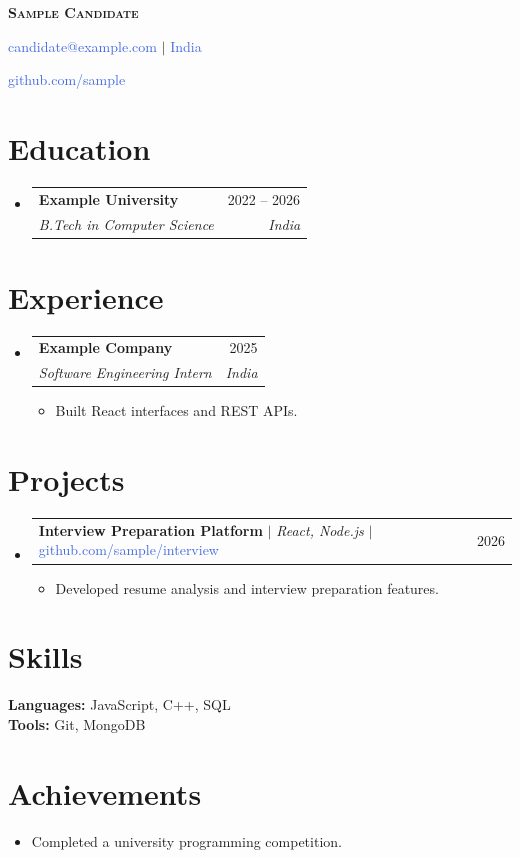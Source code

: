 \documentclass[letterpaper,10pt]{article}
\makeatletter
\newcommand{\resumeItem}[1]{
  \item\small{
    {#1}
  }
}
\newcommand{\resumeSubheading}[4]{
  \vspace{-1pt}\item
    \begin{tabular*}{0.97\textwidth}[t]{l@{\extracolsep{\fill}}r}
      \textbf{#1} & #2 \\
      \textit{\small #3} & \textit{\small #4} \\
    \end{tabular*}
    \vspace{-5pt}
}
\newcommand{\resumeProjectHeading}[2]{
    \vspace{1pt}
    \item
    \begin{tabular*}{0.97\textwidth}{l@{\extracolsep{\fill}}r}
      \small #1 & #2 \\
    \end{tabular*}
    \vspace{-5pt}
}
\newcommand{\resumeSubHeadingListStart}{
    \begin{itemize}[leftmargin=0.15in, label={}, itemsep=1pt, topsep=1pt]
}
\newcommand{\resumeSubHeadingListEnd}{
    \end{itemize}
}
\newcommand{\resumeItemListStart}{
    \begin{itemize}[leftmargin=0.18in, itemsep=0pt, topsep=0pt, parsep=0pt]
}
\newcommand{\resumeItemListEnd}{
    \end{itemize}
    \vspace{-3pt}
}
\makeatother
\begin{document}
\begin{center}
\textbf{\Huge \scshape Sample Candidate}

\vspace{3pt}
\small \textcolor{RoyalBlue}{candidate@example.com} $|$ \textcolor{RoyalBlue}{India}

\vspace{2pt}
\textcolor{RoyalBlue}{github.com/sample}
\end{center}
\vspace{-7pt}

\section{\textbf{Education}}
\resumeSubHeadingListStart
\resumeSubheading{Example University}{2022 -- 2026}{B.Tech in Computer Science}{India}

\resumeSubHeadingListEnd

\section{\textbf{Experience}}
\resumeSubHeadingListStart
\resumeSubheading{Example Company}{2025}{Software Engineering Intern}{India}
\resumeItemListStart
\resumeItem{Built React interfaces and REST APIs.}
\resumeItemListEnd
\resumeSubHeadingListEnd

\section{\textbf{Projects}}
\resumeSubHeadingListStart
\resumeProjectHeading{\textbf{Interview Preparation Platform} $|$ \emph{React, Node.js} $|$ \textcolor{RoyalBlue}{github.com/sample/interview}}{2026}
\resumeItemListStart
\resumeItem{Developed resume analysis and interview preparation features.}
\resumeItemListEnd
\resumeSubHeadingListEnd

\section{\textbf{Skills}}
\small{
\textbf{Languages:} JavaScript, C++, SQL \\
\textbf{Tools:} Git, MongoDB
}

\section{\textbf{Achievements}}
\resumeItemListStart
\resumeItem{Completed a university programming competition.}
\resumeItemListEnd
\end{document}
